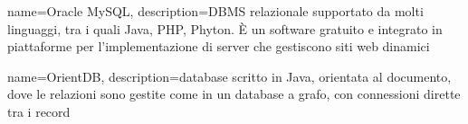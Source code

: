 

{
	name=Oracle MySQL,
	description={DBMS relazionale supportato da molti linguaggi, tra i quali Java, PHP, Phyton. \MakeUppercase{è} un software gratuito e integrato in piattaforme per l'implementazione di server che gestiscono siti web dinamici}
}

{
	name=OrientDB,
	description={database scritto in Java, orientata al documento, dove le relazioni sono gestite come in un database a grafo, con connessioni dirette tra i record}
}


